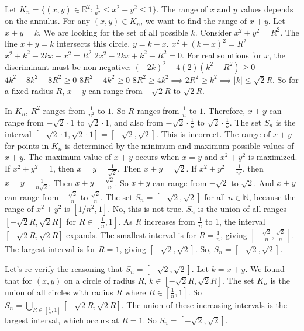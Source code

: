 \documentclass{article}
\begin{document}
\begin{itemize}
\begin{itemize}
\begin{itemize}
Let $K_n = \{(x,y) \in \mathbb{R}^2 : \frac{1}{n^2} \le x^2 + y^2 \le 1\}$.
The range of $x$ and $y$ values depends on the annulus.
For any $(x,y) \in K_n$, we want to find the range of $x+y$.
Let $x+y = k$. We are looking for the set of all possible $k$.
Consider $x^2+y^2=R^2$. The line $x+y=k$ intersects this circle.
$y = k-x$.
$x^2 + (k-x)^2 = R^2$
$x^2 + k^2 - 2kx + x^2 = R^2$
$2x^2 - 2kx + k^2 - R^2 = 0$.
For real solutions for $x$, the discriminant must be non-negative:
$(-2k)^2 - 4(2)(k^2 - R^2) \ge 0$
$4k^2 - 8k^2 + 8R^2 \ge 0$
$8R^2 - 4k^2 \ge 0$
$8R^2 \ge 4k^2 \implies 2R^2 \ge k^2 \implies |k| \le \sqrt{2}R$.
So for a fixed radius $R$, $x+y$ can range from $-\sqrt{2}R$ to $\sqrt{2}R$.

In $K_n$, $R^2$ ranges from $\frac{1}{n^2}$ to $1$. So $R$ ranges from $\frac{1}{n}$ to $1$.
Therefore, $x+y$ can range from $-\sqrt{2} \cdot 1$ to $\sqrt{2} \cdot 1$, and also from $-\sqrt{2} \cdot \frac{1}{n}$ to $\sqrt{2} \cdot \frac{1}{n}$.
The set $S_n$ is the interval $[-\sqrt{2} \cdot 1, \sqrt{2} \cdot 1] = [-\sqrt{2}, \sqrt{2}]$.
This is incorrect. The range of $x+y$ for points in $K_n$ is determined by the minimum and maximum possible values of $x+y$.
The maximum value of $x+y$ occurs when $x=y$ and $x^2+y^2$ is maximized.
If $x^2+y^2=1$, then $x=y=\frac{1}{\sqrt{2}}$. Then $x+y = \sqrt{2}$.
If $x^2+y^2=\frac{1}{n^2}$, then $x=y=\frac{1}{n\sqrt{2}}$. Then $x+y = \frac{\sqrt{2}}{n}$.
So $x+y$ can range from $-\sqrt{2}$ to $\sqrt{2}$.
And $x+y$ can range from $-\frac{\sqrt{2}}{n}$ to $\frac{\sqrt{2}}{n}$.
The set $S_n = [-\sqrt{2}, \sqrt{2}]$ for all $n \in \mathbb{N}$, because the range of $x^2+y^2$ is $[1/n^2, 1]$.
No, this is not true. $S_n$ is the union of all ranges $[-\sqrt{2}R, \sqrt{2}R]$ for $R \in [\frac{1}{n}, 1]$.
As $R$ increases from $\frac{1}{n}$ to $1$, the interval $[-\sqrt{2}R, \sqrt{2}R]$ expands.
The smallest interval is for $R = \frac{1}{n}$, giving $[-\frac{\sqrt{2}}{n}, \frac{\sqrt{2}}{n}]$.
The largest interval is for $R=1$, giving $[-\sqrt{2}, \sqrt{2}]$.
So, $S_n = [-\sqrt{2}, \sqrt{2}]$.

Let's re-verify the reasoning that $S_n = [-\sqrt{2}, \sqrt{2}]$.
Let $k = x+y$. We found that for $(x,y)$ on a circle of radius $R$, $k \in [-\sqrt{2}R, \sqrt{2}R]$.
The set $K_n$ is the union of all circles with radius $R$ where $R \in [\frac{1}{n}, 1]$.
So $S_n = \bigcup_{R \in [\frac{1}{n}, 1]} [-\sqrt{2}R, \sqrt{2}R]$.
The union of these increasing intervals is the largest interval, which occurs at $R=1$.
So $S_n = [-\sqrt{2}, \sqrt{2}]$.


\end{itemize}
\end{itemize}
\end{itemize}
\end{document}
